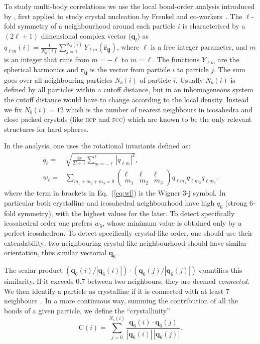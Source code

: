 \documentclass[twocolumn,superscriptaddress]{revtex4-1}
\begin{document}
To study multi-body correlations we use the local bond-order analysis introduced by
\citet{steinhardt}, first applied to study crystal nucleation by
Frenkel and co-workers~\cite{auer}. 
The $\ell$-fold symmetry of a neighbourhood around each particle $i$ is characterised by a $(2\ell+1)$ dimensional complex vector ($\mathbf{q}_l$) as $q_{\ell m}(i)=\frac{1}{N_b(i)}\sum_{j=1}^{N_b(i)} Y_{\ell m}(\mathbf{\hat{r}_{ij}})$, where
$\ell$ is a free integer parameter, and $m$ is an integer
that runs from $m=-\ell$ to $m=\ell$. The functions $Y_{\ell m}$ are the spherical harmonics
and $\mathbf{\hat{r}_{ij}}$ is the vector from particle $i$ to particle $j$.
The sum goes over all neighbouring particles $N_b(i)$ of particle $i$. Usually 
$N_b(i)$ is defined by all particles within a cutoff distance, but in an inhomogeneous system
the cutoff distance would have to change according to the local density. Instead we 
fix $N_b(i)=12$ which is the number of nearest neighbours in icosahedra and close packed crystals (like \textsc{hcp} and \textsc{fcc})
which are known to be the only relevant structures for hard spheres.

In the analysis, one uses the rotational invariants defined as:
\begin{align}
	q_\ell =& \sqrt{\frac{4\pi}{2l+1} \sum_{m=-\ell}^{\ell} |q_{\ell m}|^2 }, \label{eq:ql}\\
	w_\ell =& \sum_{m_1+m_2+m_3=0} 
			\left( \begin{array}{ccc}
				\ell & \ell & \ell \\
				m_1 & m_2 & m_3 
			\end{array} \right)
			q_{\ell m_1} q_{\ell m_2} q_{\ell m_3}. \label{eq:wl}
\end{align}
where the term in brackets in Eq.~(\ref{eq:wl}) is the Wigner 3-j symbol.
In particular both crystalline and icosahedral neighbourhood have high $q_6$ (strong 6-fold symmetry), with the highest values for the later. To detect specifically icosahedral order one prefers $w_6$, whose minimum value is obtained only by a perfect icosahedron. To detect specifically crystal-like order, one should use their extendability: two neighbouring crystal-like neighbourhood should have similar orientation, thus similar vectorial $\mathbf{q}_6$.

The scalar product $(\mathbf{q}_6(i)/|\mathbf{q}_6(i)|)\cdot(\mathbf{q}_6(j)/|\mathbf{q}_6(j)|)$ quantifies this similarity. If it exceeds $0.7$ between
two neighbours, they are deemed \emph{connected}. We then identify a particle as crystalline if it is connected with at least $7$ neighbours~\cite{auer}. In a more continuous way, summing the contribution of all the bonds of a given particle, we define the ``crystallinity''~\cite{russo_hs}
\begin{equation}\label{eqn:crystallinity}
 \text{C}(i)=\sum_{j=0}^{N_b(i)}\frac{\mathbf{q}_6(i)\cdot\mathbf{q}_6(j)}{|\mathbf{q}_6(i)|\,|\mathbf{q}_6(j)|}.
\end{equation}
\end{document}
